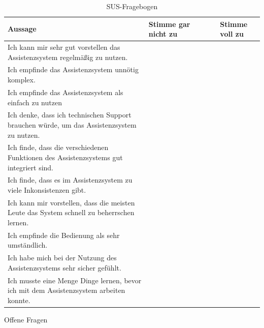 \begin{table}[htbp]
\caption{SUS-Fragebogen}
\centering
\begin{tabular}{|p{}|p{}|p{}|p{}|p{}|p{}|}
\hline
\textbf{Aussage} & Stimme gar nicht zu & & & & Stimme voll zu \\
\hline
Ich kann mir sehr gut vorstellen das Assistenzsystem regelmäßig zu nutzen. & & & & & \\
\hline
Ich empfinde das Assistenzsystem unnötig komplex. & & & & & \\
\hline
Ich empfinde das Assistenzsystem als einfach zu nutzen & & & & & \\
\hline
Ich denke, dass ich technischen Support brauchen würde, um das Assistenzsystem zu nutzen. & & & & & \\
\hline
Ich finde, dass die verschiedenen Funktionen des Assistenzsystems gut integriert sind. & & & & & \\
\hline
Ich finde, dass es im Assistenzsystem zu viele Inkonsistenzen gibt. & & & & & \\
\hline
Ich kann mir vorstellen, dass die meisten Leute das System schnell zu beherrschen lernen. & & & & & \\
\hline
Ich empfinde die Bedienung als sehr umständlich. & & & & & \\
\hline
Ich habe mich bei der Nutzung des Assistenzsystems sehr sicher gefühlt. & & & & & \\
\hline
Ich musste eine Menge Dinge lernen, bevor ich mit dem Assistenzsystem arbeiten konnte. & & & & & \\
\hline
\end{tabular}
\end{table}

Offene Fragen 